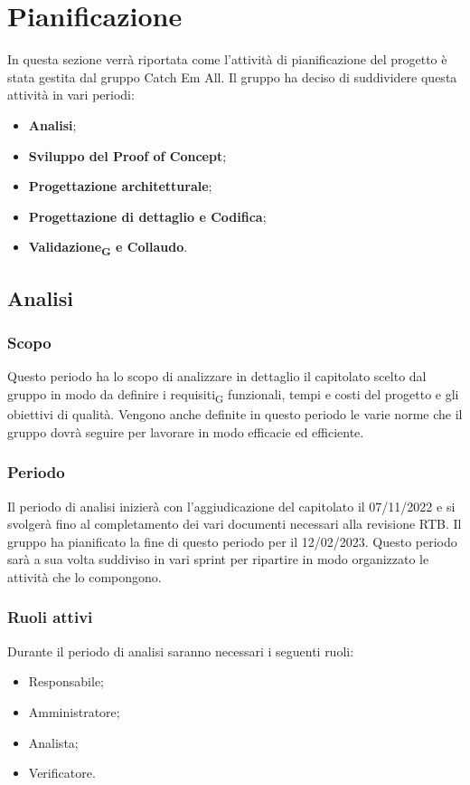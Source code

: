 \section{Pianificazione}
In questa sezione verrà riportata come l'attività di pianificazione del progetto è stata gestita dal gruppo Catch Em All. Il gruppo ha deciso di suddividere questa attività in vari periodi: 
\begin{itemize}
	\item \textbf{Analisi};
	\item \textbf{Sviluppo del Proof of Concept};
	\item \textbf{Progettazione architetturale};
    \item \textbf{Progettazione di dettaglio e Codifica};
	\item \textbf{Validazione\textsubscript{G} e Collaudo}.
\end{itemize}

\subsection{Analisi}
\subsubsection{Scopo}
Questo periodo ha lo scopo di analizzare in dettaglio il capitolato scelto dal gruppo in modo da definire i requisiti\textsubscript{G} funzionali, tempi e costi del progetto e gli obiettivi di qualità. Vengono anche definite in questo periodo le varie norme che il gruppo dovrà seguire per lavorare in modo efficacie ed efficiente.

\subsubsection{Periodo}
Il periodo di analisi inizierà con l'aggiudicazione del capitolato il 07/11/2022 e si svolgerà fino al completamento dei vari documenti necessari alla revisione  RTB. Il gruppo ha pianificato la fine di questo periodo per il 12/02/2023. Questo periodo sarà a sua volta suddiviso in vari sprint per ripartire in modo organizzato le attività che lo compongono.

\subsubsection{Ruoli attivi}
Durante il periodo di analisi saranno necessari i seguenti ruoli:
\begin{itemize}
	\item Responsabile;
	\item Amministratore;
	\item Analista;
	\item Verificatore.
\end{itemize}

